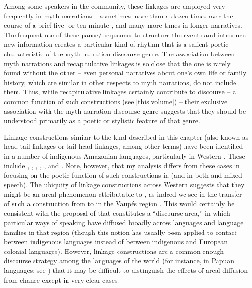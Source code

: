 \documentclass[output=paper]{LSP/langsci}
\begin{document}
Among some speakers in the community, these linkages are employed very frequently in myth narrations – sometimes more than a dozen times over the course of a brief five- or ten-minute , and many more times in longer narratives. The frequent use of these pause/ sequences to structure the events and introduce new information creates a particular kind of  rhythm that is a salient poetic characteristic of the myth narration discourse genre. The association between myth narrations and recapitulative linkages is so close that the one is rarely found without the other – even personal narratives about one’s own life or family history, which are similar in other respects to myth narrations, do not include them. Thus, while recapitulative linkages certainly contribute to discourse  – a common function of such constructions (see \citealt{chapters/01Guerin-Aiton} [this volume]) – their exclusive association with the myth narration discourse genre suggests that they should be understood primarily as a poetic or stylistic feature of that genre.

Linkage constructions similar to the kind described in this chapter (also known as head-tail linkages or tail-head linkages, among other terms) have been identified in a number of indigenous Amazonian languages, particularly in Western . These include  \citep{Guillaume2011},  \citep[][169--171]{aikhenvald02},  \citep{vangijn14},  \citep{overall14},  \citep[][515--522]{kasia17}, and  \citep[][598--599]{vuill12}. Note, however, that my analysis differs from these cases in focusing on the poetic function of such constructions in  (and in both  and mixed - speech). The ubiquity of linkage constructions across Western  suggests that they might be an areal phenomenon attributable to  \citep[][916]{seifart10}, as indeed we see in the transfer of such a construction from  to  in the Vaupés region \citep[][169--171]{aikhenvald02}. This would certainly be consistent with the proposal of \citet{beieretal.2002} that  constitutes a ``discourse area,'' in which particular ways of speaking have diffused broadly across languages and language families in that region (though this notion has usually been applied to contact between indigenous languages instead of between indigenous and European colonial languages). However, linkage constructions are a common enough discourse strategy among the languages of the world (for instance, in Papuan languages; see \citealt{devries.2005}) that it may be difficult to distinguish the effects of areal diffusion from chance except in very clear cases.
\end{document}
